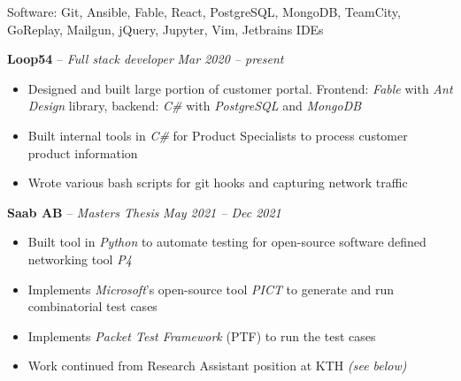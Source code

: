 \documentclass[10pt,letterpaper]{article}
\begin{document}
\inlineheadsection 
{Software:}
{Git, Ansible, Fable, React, PostgreSQL, MongoDB, TeamCity, GoReplay, Mailgun, jQuery, Jupyter, Vim, Jetbrains IDEs}
\vspace{0.5em}
										
									
\spacedhrule{1em}{-1em}







\headedsection
{\textbf{Loop54} -- \textit{Full stack developer}}
{\textit{Mar 2020 -- present}} {
	\begin{itemize}[noitemsep,nolistsep]
		\item Designed and built large portion of customer portal. Frontend: \textit{Fable} with \textit{Ant Design} library, backend: \textit{C\#} with \textit{PostgreSQL} and \textit{MongoDB}
		\item Built internal tools in \textit{C\#} for Product Specialists to process customer product information
		\item Wrote various bash scripts for git hooks and capturing network traffic 
	\end{itemize}
}
\vspace{-1mm}


\headedsection
{\textbf{Saab AB} -- \textit{Masters Thesis}}
{\textit{May 2021 -- Dec 2021}} {
	\begin{itemize}[noitemsep,nolistsep]
		\item Built tool in \textit{Python} to automate testing for open-source software defined networking tool \textit{P4}
		\item Implements \textit{Microsoft}'s open-source tool \textit{PICT} to generate and run combinatorial test cases
		\item Implements \textit{Packet Test Framework} (PTF) to run the test cases
		\item Work continued from Research Assistant position at KTH \textit{(see below)}
	\end{itemize}
}
\vspace{-1mm}
\end{document}

